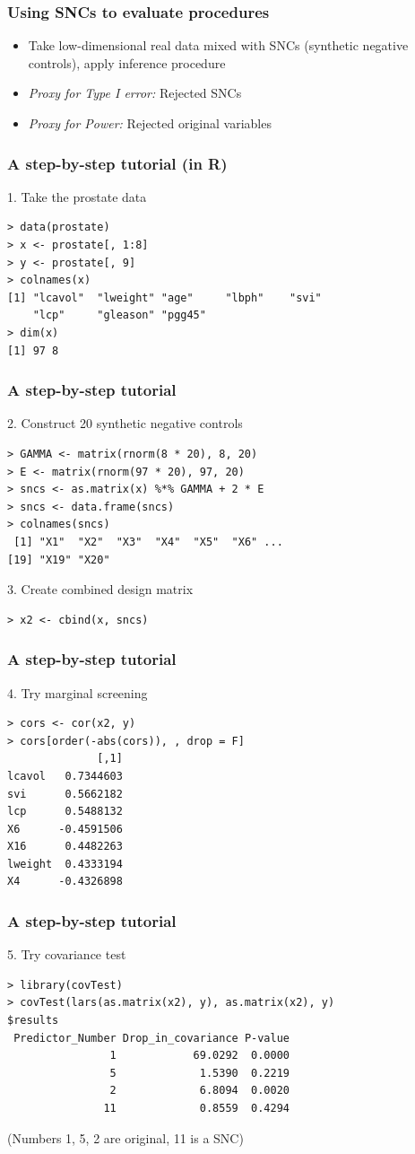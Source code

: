 \documentclass{beamer}
\begin{document}
\begin{frame}
\frametitle{Using SNCs to evaluate procedures}
\begin{itemize}
\item Take low-dimensional real data mixed with SNCs (synthetic negative controls), apply inference procedure
\item \emph{Proxy for Type I error:} Rejected SNCs
\item \emph{Proxy for Power:} Rejected original variables
\end{itemize}
\end{frame}

\begin{frame}[fragile]
\frametitle{A step-by-step tutorial (in R)}
1. Take the prostate data
\begin{verbatim}
> data(prostate)
> x <- prostate[, 1:8]
> y <- prostate[, 9]
> colnames(x)
[1] "lcavol"  "lweight" "age"     "lbph"    "svi"
    "lcp"     "gleason" "pgg45"  
> dim(x)
[1] 97 8
\end{verbatim}
\end{frame}

\begin{frame}[fragile]
\frametitle{A step-by-step tutorial}
2. Construct 20 synthetic negative controls
\begin{verbatim}
> GAMMA <- matrix(rnorm(8 * 20), 8, 20)
> E <- matrix(rnorm(97 * 20), 97, 20)
> sncs <- as.matrix(x) %*% GAMMA + 2 * E
> sncs <- data.frame(sncs)
> colnames(sncs)
 [1] "X1"  "X2"  "X3"  "X4"  "X5"  "X6" ...
[19] "X19" "X20"
\end{verbatim}
3. Create combined design matrix
\begin{verbatim}
> x2 <- cbind(x, sncs)
\end{verbatim}
\end{frame}

\begin{frame}[fragile]
\frametitle{A step-by-step tutorial}
4. Try marginal screening
\begin{verbatim}
> cors <- cor(x2, y)
> cors[order(-abs(cors)), , drop = F]
              [,1]
lcavol   0.7344603
svi      0.5662182
lcp      0.5488132
X6      -0.4591506
X16      0.4482263
lweight  0.4333194
X4      -0.4326898
\end{verbatim}
\end{frame}

\begin{frame}[fragile]
\frametitle{A step-by-step tutorial}
5. Try covariance test
\begin{verbatim}
> library(covTest)
> covTest(lars(as.matrix(x2), y), as.matrix(x2), y)
$results
 Predictor_Number Drop_in_covariance P-value
                1            69.0292  0.0000
                5             1.5390  0.2219
                2             6.8094  0.0020
               11             0.8559  0.4294
\end{verbatim}
(Numbers 1, 5, 2 are original, 11 is a SNC)
\end{frame}
\end{document}
